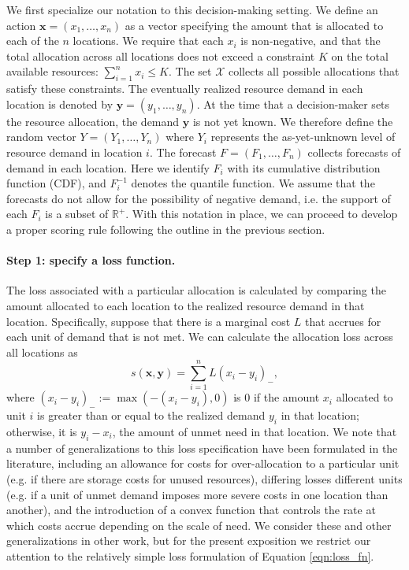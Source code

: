 \documentclass{article}
\begin{document}
We first specialize our notation to this decision-making setting. We define an action $\mathbf{x} = (x_1, \ldots, x_n)$ as a vector specifying the amount that is allocated to each of the $n$ locations. We require that each $x_i$ is non-negative, and that the total allocation across all locations does not exceed a constraint $K$ on the total available resources: $\sum_{i=1}^n x_i \leq K$. The set $\mathcal{X}$ collects all possible allocations that satisfy these constraints. The eventually realized resource demand in each location is denoted by $\mathbf{y} = (y_1, \ldots, y_n)$. At the time that a decision-maker sets the resource allocation, the demand $\mathbf{y}$ is not yet known. We therefore define the random vector $Y = (Y_1, \ldots, Y_n)$ where $Y_i$ represents the as-yet-unknown level of resource demand in location $i$. The forecast $F = (F_1, \ldots, F_n)$ collects forecasts of demand in each location. Here we identify $F_i$ with its cumulative distribution function (CDF), and $F_i^{-1}$ denotes the quantile function. We assume that the forecasts do not allow for the possibility of negative demand, i.e. the support of each $F_i$ is a subset of $\mathbb{R}^+$. With this notation in place, we can proceed to develop a proper scoring rule following the outline in the previous section.

\paragraph{Step 1: specify a loss function.} The loss associated with a particular allocation is calculated by comparing the amount allocated to each location to the realized resource demand in that location. Specifically, suppose that there is a marginal cost $L$ that accrues for each unit of demand that is not met. We can calculate the allocation loss across all locations as
\begin{equation}
s(\mathbf{x}, \mathbf{y}) = \sum_{i=1}^n L (x_i - y_i)_-, \label{eqn:loss_fn}
\end{equation}
where $(x_i - y_i)_- := \max(-(x_i - y_i),0)$ is $0$ if the amount $x_i$ allocated to unit $i$ is greater than or equal to the realized demand $y_i$ in that location; otherwise, it is $y_i - x_i$, the amount of unmet need in that location. We note that a number of generalizations to this loss specification have been formulated in the literature, including an allowance for costs for over-allocation to a particular unit (e.g. if there are storage costs for unused resources), differing losses different units (e.g. if a unit of unmet demand imposes more severe costs in one location than another), and the introduction of a convex function that controls the rate at which costs accrue depending on the scale of need. We consider these and other generalizations in other work, but for the present exposition we restrict our attention to the relatively simple loss formulation of Equation \eqref{eqn:loss_fn}.
\end{document}
